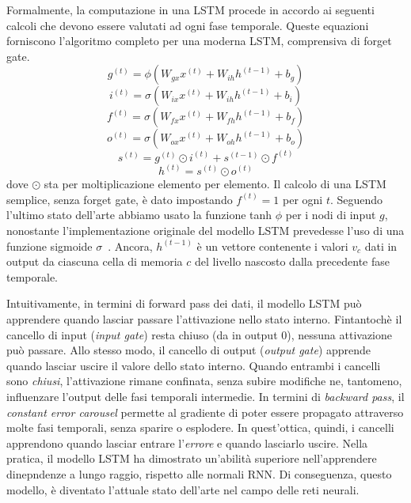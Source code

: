 Formalmente, la computazione in una LSTM procede in accordo ai seguenti calcoli
che devono essere valutati ad ogni fase temporale. Queste equazioni forniscono
l'algoritmo completo per una moderna LSTM, comprensiva di forget gate.
\begin{equation}
  g^{(t)} = \phi(W_{gx}x^{(t)} + W_{ih}h^{(t-1)} + b_g)
\end{equation}
\begin{equation}
  i^{(t)} = \sigma(W_{ix}x^{(t)} + W_{ih}h^{(t-1)} + b_i)
\end{equation}
\begin{equation}
  f^{(t)} = \sigma(W_{fx}x^{(t)} + W_{fh}h^{(t-1)} + b_f)
\end{equation}
\begin{equation}
  o^{(t)} = \sigma(W_{ox}x^{(t)} + W_{oh}h^{(t-1)} + b_o)
\end{equation}
\begin{equation}
  s^{(t)} = g^{(t)} \odot i^{(t)} + s^{(t-1)} \odot f^{(t)}
\end{equation}
\begin{equation}
  h^{(t)} = s^{(t)} \odot o^{(t)}
\end{equation}
dove $\odot$ sta per moltiplicazione elemento per elemento.
Il calcolo di una LSTM semplice, senza forget gate, \`e dato impostando
$f^{(t)} = 1$ per ogni $t$. Seguendo l'ultimo stato dell'arte abbiamo usato la
funzione tanh $\phi$ per i nodi di input $g$, nonostante l'implementazione
originale del modello LSTM prevedesse l'uso di una funzione sigmoide $\sigma$~\cite{Hochreiter:1997}.
Ancora, $h^{(t-1)}$ \`e un vettore contenente i valori $v_c$ dati in output da
ciascuna cella di memoria $c$ del livello nascosto dalla precedente fase temporale.

Intuitivamente, in termini di forward pass dei dati, il modello LSTM pu\`o
apprendere quando lasciar passare l'attivazione nello stato interno. Fintantoch\`e
il cancello di input (\emph{input gate}) resta chiuso (da in output 0), nessuna
attivazione pu\`o passare. Allo stesso modo, il cancello di output (\emph{output
gate}) apprende quando lasciar uscire il valore dello stato interno. Quando
entrambi i cancelli sono \emph{chiusi}, l'attivazione rimane confinata, senza
subire modifiche ne, tantomeno, influenzare l'output delle fasi temporali intermedie.
In termini di \emph{backward pass}, il \emph{constant error carousel} permette al
gradiente di poter essere propagato attraverso molte fasi temporali, senza sparire
o esplodere. In quest'ottica, quindi, i cancelli apprendono quando lasciar entrare
l'\emph{errore} e quando lasciarlo uscire. Nella pratica, il modello LSTM ha
dimostrato un'abilit\`a superiore nell'apprendere dinepndenze a lungo raggio,
rispetto alle normali RNN. Di conseguenza, questo modello, \`e diventato
l'attuale stato dell'arte nel campo delle reti neurali.

